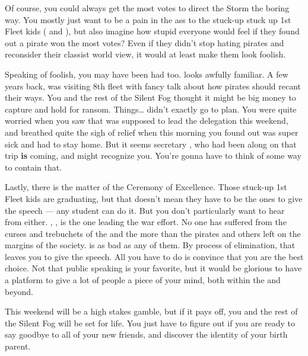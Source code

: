 \documentclass[char]{GL2020}
\begin{document}
Of course, you could always get the most votes to direct the Storm the boring way. You mostly just want to be a pain in the ass to the stuck-up stuck up 1st Fleet kids (\cPresident{\full} and \cInitiate{\full}), but also imagine how stupid everyone would feel if they found out a pirate won the most votes? Even if they didn't stop hating pirates and reconsider their classist world view, it would at least make them look foolish.

Speaking of foolish, you may have been had too. \cChupLeader{\full} looks awfully familiar. A few years back, \cHeadDiplomat{\full} was visiting 8th fleet with \cHeadDiplomat{\their} fancy talk about how pirates should recant their ways. You and the rest of the Silent Fog thought it might be big money to capture \cHeadDiplomat{} and hold \cHeadDiplomat{\them} for ransom. Things\ldots{} didn't exactly go to plan. You were quite worried when you saw that \cHeadDiplomat{} was supposed to lead the \pShip{} delegation this weekend, and breathed quite the sigh of relief when this morning you found out \cHeadDiplomat{} was super sick and had to stay home. But it seems \cHeadDiplomat{\their} secretary \cChupLeader{}, who had been along on that trip \textbf{is} coming, and \cChupLeader{\they} might recognize you. You're gonna have to think of some way to contain that.

Lastly, there is the matter of the Ceremony of Excellence. Those stuck-up 1st Fleet kids are graduating, but that doesn't mean they have to be the ones to give the speech — any student can do it. But you don't particularly want to hear from \cWarlordDaughter{\full} either. \cWarlordDaughter{\Their} \cLoud{\parent}, \cLoud{\full}, is the one leading the war effort. No one has suffered from the curses and trebuchets of the \pFarm{} and the \pTech{} more than the pirates and others left on the margins of the \pShip{} society. \cWarlordDaughter{} is as bad as any of them. By process of elimination, that leaves you to give the speech. All you have to do is convince \cMusic{\full} that you are the best choice. Not that public speaking is your favorite, but it would be glorious to have a platform to give a lot of people a piece of your mind, both within the \pShippies{} and beyond.

This weekend will be a high stakes gamble, but if it pays off, you and the rest of the Silent Fog will be set for life. You just have to figure out if you are ready to say goodbye to all of your new friends, and discover the identity of your birth parent.
\end{document}
